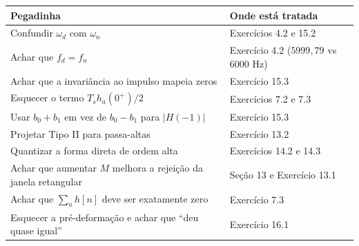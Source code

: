 \begin{center}
\small
\begin{tabular}{p{6.7cm}p{8.3cm}}
\toprule
Pegadinha & Onde está tratada\\ \midrule
Confundir $\omega_d$ com $\omega_n$ & Exercícios 4.2 e 15.2\\
Achar que $f_d=f_n$ & Exercício 4.2 ($5999{,}79$ vs $6000$ Hz)\\
Achar que a invariância ao impulso mapeia zeros & Exercício 15.3\\
Esquecer o termo $T_sh_a(0^+)/2$ & Exercícios 7.2 e 7.3\\
Usar $b_0+b_1$ em vez de $b_0-b_1$ para $|H(-1)|$ & Exercício 15.3\\
Projetar Tipo II para passa-altas & Exercício 13.2\\
Quantizar a forma direta de ordem alta & Exercícios 14.2 e 14.3\\
Achar que aumentar $M$ melhora a rejeição da janela retangular & Seção 13 e
Exercício 13.1\\
Achar que $\sum_n h[n]$ deve ser exatamente zero & Exercício 7.3\\
Esquecer a pré-deformação e achar que ``deu quase igual'' & Exercício 16.1\\
\bottomrule
\end{tabular}
\end{center}
